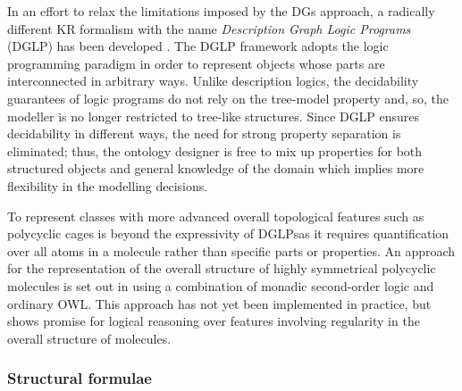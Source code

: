 \documentclass[10pt]{bmc_article}
\newenvironment{bmcformat}{\baselineskip20pt\sloppy\setboolean{publ}{false}}{\baselineskip20pt\sloppy}
\begin{document}
\begin{bmcformat}
In an effort to relax the limitations imposed by the DGs approach, a radically different KR formalism with the name \emph{Description Graph Logic Programs} (DGLP) has been developed \cite{magka2011}. The DGLP framework adopts the logic programming paradigm in order to represent objects whose parts are interconnected in arbitrary ways. Unlike description logics, the decidability guarantees of logic programs do not rely on the tree-model property and, so, the modeller is no longer restricted to tree-like structures. Since DGLP ensures decidability in different ways, the need for strong property separation is eliminated; thus, the ontology designer is free to mix up properties for both structured objects and general knowledge of the domain which implies more flexibility in the  modelling decisions.  


% 
%  
% 

To represent classes with more advanced overall topological features such as polycyclic cages is beyond the expressivity of DGLPsas it requires quantification over all atoms in a molecule rather than specific parts or properties. An approach for the representation of the overall structure of highly symmetrical polycyclic molecules is set out in \cite{hastings2011} using a combination of monadic second-order logic and ordinary OWL.  This approach has not yet been implemented in practice, but shows promise for logical reasoning over features involving regularity in the overall structure of molecules. 
  
\subsubsection*{Structural formulae}  
\label{subsubsec:entire}


\end{bmcformat}
\end{document}
